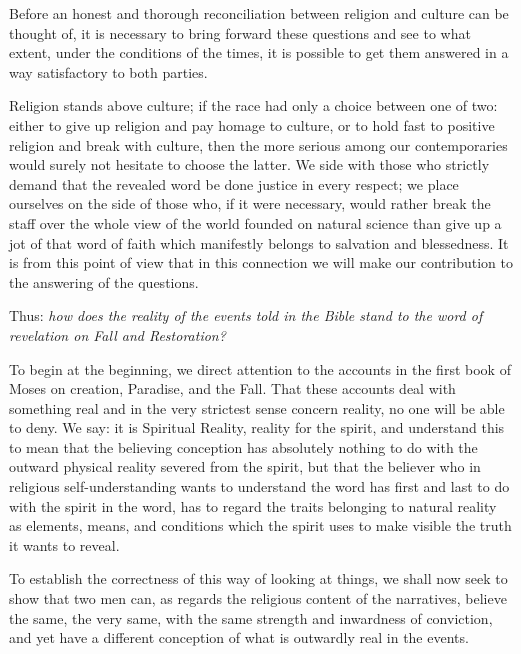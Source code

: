 \documentclass[12pt,a4paper,openany]{book}
\newcommand{\opage}[1]{\marginnote{\footnotesize\textit{[#1]}}}
\begin{document}
Before an honest and thorough reconciliation
between religion and culture can be thought of, it is necessary to bring forward
these questions and see to what extent, under the
conditions of the times, it is possible to get them answered in a way
satisfactory to both parties.

Religion stands above culture; if the race had only
a choice between one of two: either to give up religion and
pay homage to culture, or to hold fast to positive religion
and break with culture, then the more serious among our
contemporaries would surely not hesitate to choose the latter.
We side with those who strictly demand that the revealed
word be done justice in every respect; we place ourselves
on the side of those who, if it were necessary, would rather
break the staff over the whole view of the world founded on natural science
than give up a jot of
that word of faith which manifestly belongs to salvation and blessedness.
It is from this point of view that in this connection we
will make our contribution to the answering of the questions.

Thus: \emph{how does the reality
of the events told in the Bible stand to
the word of revelation on Fall and Restoration?}

To begin at the beginning, we direct
attention to the accounts in the first book of Moses
on creation, Paradise, and the Fall. That these accounts
deal with something real and in the very strictest
sense concern reality, no one will be able to deny.
We say: it is Spiritual Reality, reality for the spirit,
and understand this to mean that the believing conception
has absolutely nothing to do with the outward physical reality
severed from
\setcounter{footnote}{0}%
\opage{301}the spirit, but that the believer
who in religious self-understanding wants to understand the word has first and
last to do with the spirit in the word, has to regard
the traits belonging to natural reality as elements,
means, and conditions which the spirit uses to make visible
the truth it wants to reveal.

To establish the correctness of this way of looking at things,
we shall now seek to show that two men can, as regards
the religious content of the narratives, believe the same,
the very same, with the same strength and inwardness
of conviction, and yet have a different conception
of what is outwardly real in the events.
\end{document}
